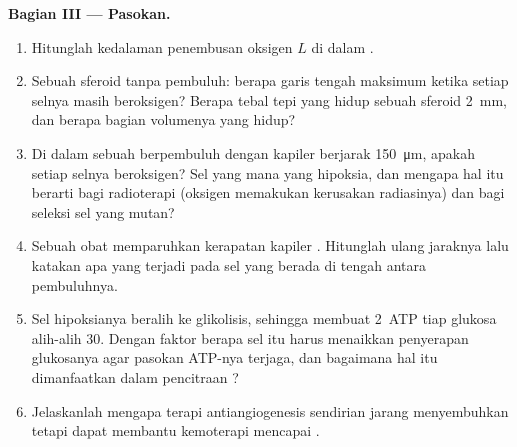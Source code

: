 \begin{problem}
\medskip
\noindent\textbf{Bagian III --- Pasokan.}
\begin{enumerate}[resume]
  \item Hitunglah kedalaman penembusan oksigen $L$ di dalam .
  \item Sebuah sferoid tanpa pembuluh: berapa garis tengah maksimum ketika
        setiap selnya masih beroksigen? Berapa tebal tepi yang hidup
        sebuah sferoid \qty{2}{mm}, dan berapa bagian volumenya
        yang hidup?
  \item Di dalam sebuah  berpembuluh dengan kapiler berjarak
        \qty{150}{\micro m}, apakah setiap selnya beroksigen? Sel yang mana
        yang hipoksia, dan mengapa hal itu berarti bagi radioterapi (oksigen
        memakukan kerusakan radiasinya) dan bagi seleksi sel yang  mutan?
  \item Sebuah obat memparuhkan kerapatan kapiler . Hitunglah ulang
        jaraknya lalu katakan apa yang terjadi pada sel yang berada di tengah
        antara pembuluhnya.
  \item Sel hipoksianya beralih ke glikolisis, sehingga membuat \qty{2}{ATP}
        tiap glukosa alih-alih $30$. Dengan faktor berapa sel itu harus
        menaikkan penyerapan glukosanya agar pasokan ATP-nya terjaga, dan
        bagaimana hal itu dimanfaatkan dalam pencitraan ?
  \item Jelaskanlah mengapa terapi antiangiogenesis sendirian jarang
        menyembuhkan tetapi dapat membantu kemoterapi mencapai .
\end{enumerate}


\end{problem}
